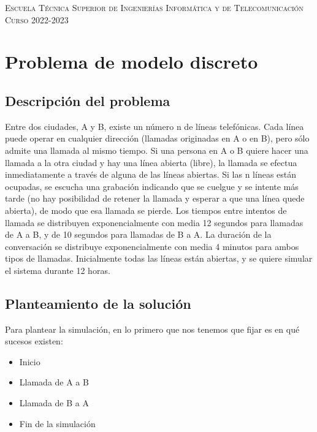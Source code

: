 \documentclass[11pt,a4paper]{report}
\begin{document}
\begin{titlepage}
\begin{minipage}{\textwidth}
\vspace{0.7cm}
\textsc{Escuela Técnica Superior de Ingenierías Informática y de Telecomunicación}\\
\vspace{1cm}
\textsc{Curso 2022-2023}
\end{minipage}
\end{titlepage}

\tableofcontents
\thispagestyle{empty}				%

\newpage

\setlength{\parskip}{1em}

\chapter{Problema de modelo discreto}

\newpage

\section{Descripción del problema}

Entre dos ciudades, A y B, existe un número n de líneas telefónicas. Cada línea puede operar en cualquier dirección (llamadas originadas en A o en B), pero sólo admite una llamada al mismo tiempo. Si una persona en A o B quiere hacer una llamada a la otra ciudad y hay una línea abierta (libre), la llamada se efectua inmediatamente a través de alguna de las líneas abiertas. Si las n líneas están ocupadas, se escucha una grabación indicando que se cuelgue y se intente más tarde (no hay posibilidad de retener la llamada y esperar a que una línea quede abierta), de modo que esa llamada se pierde. Los tiempos entre intentos de llamada se distribuyen exponencialmente con media 12 segundos para llamadas de A a B, y de 10 segundos para llamadas de B a A. La duración de la conversación se distribuye exponencialmente con media 4 minutos para ambos tipos de llamadas. Inicialmente todas las líneas están abiertas, y se quiere simular el sistema durante 12 horas.

\section{Planteamiento de la solución}

Para plantear la simulación, en lo primero que nos tenemos que fijar es en qué sucesos existen:

\begin{itemize}
	\item{Inicio}
	\item{Llamada de A a B}
	\item{Llamada de B a A}
	\item{Fin de la simulación}
\end{itemize}
\end{document}
